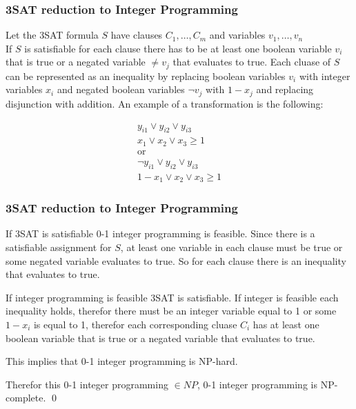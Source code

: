 \documentclass[mathserif]{beamer}
\begin{document}
\begin{frame}
\frametitle{3SAT reduction to Integer Programming}

Let the 3SAT formula $S$ have clauses $C_1,\ldots,C_m$ and variables
$v_1,\ldots,v_n$\\

If $S$ is satisfiable for each clause there has to be at least one boolean
variable $v_i$ that is true or a negated variable $\neq v_j$ that evaluates to
true. Each cluase of $S$ can be represented as an inequality by replacing
boolean variables $v_i$ with integer variables $x_i$ and negated boolean
variables $\neg v_j$ with $1 - x_j$ and replacing disjunction with addition. An
example of a transformation is the following:

\begin{align*}
	y_{i1} \vee y_{i2} \vee y_{i3}\\
	x_{1} \vee x_{2} \vee x_{3} \geq 1\\
	\text{or}\\
	\neg y_{i1} \vee y_{i2} \vee y_{i3}\\
	1 - x_{1} \vee x_{2} \vee x_{3} \geq 1
\end{align*}

\end{frame}

\begin{frame}
\frametitle{3SAT reduction to Integer Programming}

If 3SAT is satisfiable 0-1 integer programming is feasible. Since there is a satisfiable assignment for $S$, at least one variable in each
clause must be true or some negated variable evaluates to true. So for each
clause there is an inequality that evaluates to true.

If integer programming is feasible 3SAT is satisfiable. If integer is feasible
each inequality holds, therefor there must be an integer variable equal to 1 or
some $1 - x_i$ is equal to 1, therefor each corresponding cluase $C_i$ has at
least one boolean variable that is true or a negated variable that evaluates to
true.

This implies that 0-1 integer programming is NP-hard.

Therefor this 0-1 integer programming $\in \mathit{NP}$, 0-1 integer
programming is NP-complete. \qed

\end{frame}
\end{document}
